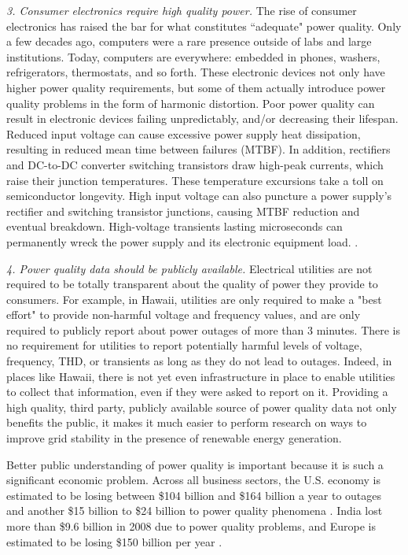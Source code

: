 {\em 3. Consumer electronics require high quality power.} The rise of consumer electronics has raised the bar for what constitutes ``adequate" power quality. Only a few decades ago, computers were a rare presence outside of labs and large institutions. Today, computers are everywhere: embedded in phones, washers, refrigerators, thermostats, and so forth. These electronic devices not only have higher power quality requirements, but some of them actually introduce power quality problems in the form of harmonic distortion. Poor power quality can result in electronic devices failing unpredictably, and/or decreasing their lifespan. Reduced input voltage can cause excessive power supply heat dissipation, resulting in reduced mean time between failures (MTBF). In addition, rectifiers and DC-to-DC converter switching transistors draw high-peak currents, which raise their junction temperatures. These temperature excursions take a toll on semiconductor longevity. High input voltage can also puncture a power supply's rectifier and switching transistor junctions, causing MTBF reduction and eventual breakdown. High-voltage transients lasting microseconds can permanently wreck the power supply and its electronic equipment load. \cite{dedad_when_2008}.

{\em 4. Power quality data should be publicly available.} Electrical utilities are not required to be totally transparent about the quality of power they provide to consumers. For example, in Hawaii, utilities are only required to make a "best effort" to provide non-harmful voltage and frequency values, and are only required to publicly report about power outages of more than 3 minutes. There is no requirement for utilities to report potentially harmful levels of voltage, frequency, THD, or transients as long as they do not lead to outages. Indeed, in places like Hawaii, there is not yet even infrastructure in place to enable utilities to collect that information, even if they were asked to report on it.  Providing a high quality, third party, publicly available source of power quality data not only benefits the public, it makes it much easier to perform research on ways to improve grid stability in the presence of renewable energy generation.

Better public understanding of power quality is important because it is such a significant economic problem. Across all business sectors, the U.S. economy is estimated to be losing between \$104 billion and \$164 billion a year to outages and another \$15 billion to \$24 billion to power quality phenomena \cite{elphick_summary_2015}. India lost more than \$9.6 billion in 2008 due to power quality problems, and Europe is estimated to be losing \$150 billion per year \cite{laskar_power_2012}.

